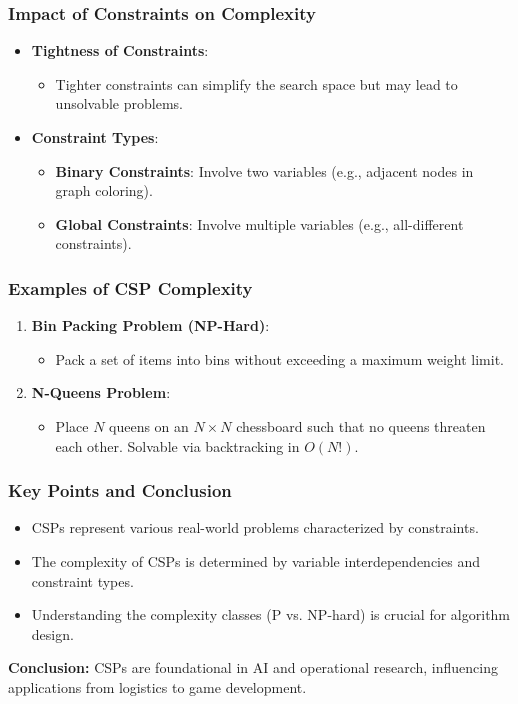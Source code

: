\documentclass[aspectratio=169]{beamer}
\begin{document}
\begin{frame}[fragile]
    \frametitle{Impact of Constraints on Complexity}
    \begin{itemize}
        \item \textbf{Tightness of Constraints}:
        \begin{itemize}
            \item Tighter constraints can simplify the search space but may lead to unsolvable problems.
        \end{itemize}

        \item \textbf{Constraint Types}:
        \begin{itemize}
            \item \textbf{Binary Constraints}: Involve two variables (e.g., adjacent nodes in graph coloring).
            \item \textbf{Global Constraints}: Involve multiple variables (e.g., all-different constraints).
        \end{itemize}
    \end{itemize}
\end{frame}

\begin{frame}[fragile]
    \frametitle{Examples of CSP Complexity}
    \begin{enumerate}
        \item \textbf{Bin Packing Problem (NP-Hard)}:
        \begin{itemize}
            \item Pack a set of items into bins without exceeding a maximum weight limit.
        \end{itemize}
        
        \item \textbf{N-Queens Problem}:
        \begin{itemize}
            \item Place \(N\) queens on an \(N \times N\) chessboard such that no queens threaten each other. Solvable via backtracking in \(O(N!)\).
        \end{itemize}
    \end{enumerate}
\end{frame}

\begin{frame}[fragile]
    \frametitle{Key Points and Conclusion}
    \begin{itemize}
        \item CSPs represent various real-world problems characterized by constraints.
        \item The complexity of CSPs is determined by variable interdependencies and constraint types.
        \item Understanding the complexity classes (P vs. NP-hard) is crucial for algorithm design.
    \end{itemize}
    
    \textbf{Conclusion:} CSPs are foundational in AI and operational research, influencing applications from logistics to game development.
\end{frame}
\end{document}
